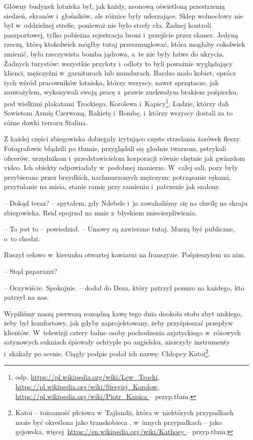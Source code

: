 \documentclass[oneside,polish,11pt,sfheadings]{mwbk}
\begin{document}
Główny budynek lotniska był, jak każdy, neonową oświetloną przestrzenią
siedzeń, ekranów i~głośników, ale różnice były uderzające. Sklep
wolnocłowy nie był w~oddzielnej strefie, ponieważ nie było strefy cła.
Żadnej kontroli paszportowej, tylko pobieżna rejestracja broni i~przejście przez skaner. Jedyną rzeczą, którą ktokolwiek mógłby tutaj
przeszmuglować, która mogłaby cokolwiek zmienić, była rzeczywista bomba
jądrowa, a~te nie były łatwe do ukrycia. Żadnych turystów: wszystkie
przyloty i~odloty to byli poważnie wyglądający klienci, mężczyźni w~garniturach lub mundurach. Bardzo mało kobiet, oprócz tych wśród
pracowników lotniska, którzy wszyscy, nawet sprzątacze, jak zauważyłem,
wykonywali swoją pracę z~prawie zuchwałym brakiem pośpiechu, pod
wielkimi plakatami Trockiego, Korolewa i~Kapicy\footnote{odp.
\url{https://pl.wikipedia.org/wiki/Lew_Trocki},
\url{https://pl.wikipedia.org/wiki/Siergiej_Korolow},
\url{https://pl.wikipedia.org/wiki/Piotr_Kapica } -- przyp.tłum.}. Ludzie,
którzy dali Sowietom Armię Czerwoną, Rakietę i~Bombę, i~którzy wszyscy
dostali za to różne dawki terroru Stalina.

Z każdej części zbiegowiska dobiegały irytująco częste strzelania
żarówek fleszy. Fotografowie błądzili po tłumie, przyglądali się głodnie
twarzom, pstrykali oficerów, urzędnikom i~przedstawicielom korporacji
równie chętnie jak gwiazdom video. Ich obiekty odpowiadały w~podobnej
manierze. W~całej sali, pozy były przybierane przez brzydkich,
nachmurzonych mężczyzn: potrząsanie rękami, przytulanie na misia, stanie
ramię przy ramieniu i~patrzenie jak szalony.

-- Dokąd teraz? -- spytałem, gdy Ndebele i~ja zawahaliśmy się na chwilę na
skraju zbiegowiska. Reid spojrzał na mnie z~błyskiem zniecierpliwienia.

-- To jest to -- powiedział. -- Umowy są zawierane tutaj. Muszą być
publiczne, o~to chodzi.

Ruszył celowo w~kierunku otwartej kawiarni na franszyzie. Pośpieszyłem
za nim.

-- Stąd paparazzi?

-- Oczywiście. Spokojnie. -- dodał do Deza, który patrzył ponuro na
każdego, kto patrzył na nas.

Wypiliśmy naszą pierwszą rozsądną kawę tego dnia dookoła stołu zbyt
niskiego, żeby był komfortowy, jak gdyby zaprojektowany, żeby
przyśpieszać przepływ klientów. W~telewizji cztery ładne osoby
pochodzenia azjatyckiego w~różowych satynowych sukniach śpiewały
ochryple po angielsku, niszczyły instrumenty i~skakały po scenie. Ciągły
podpis podał ich nazwę: Chłopcy Katoi\footnote{Katoi -- tożsamość płciowa w~Tajlandii, która w~niektórych
przypadkach może być określona jako transkobieca , w~innych przypadkach -- jako gejowska,
więcej~\url{https://en.wikipedia.org/wiki/Kathoey } -- przyp.tłum.}.
\end{document}
